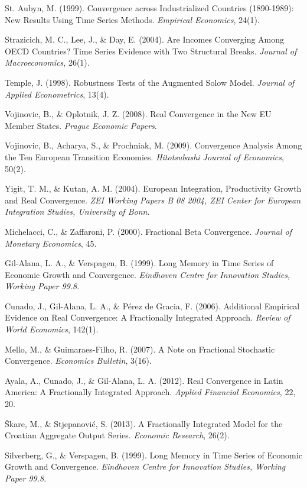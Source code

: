 \documentclass{crebsshr}
\begin{document}
\begin{thebibliography}{160}
St. Aubyn, M. (1999). Convergence across Industrialized Countries (1890-1989): New Results Using Time Series Methods. \emph{Empirical Economics}, 24(1).

Strazicich, M. C., Lee, J., \& Day, E. (2004). Are Incomes Converging Among OECD Countries? Time Series Evidence with Two Structural Breaks. \emph{Journal of Macroeconomics}, 26(1).

Temple, J. (1998). Robustness Tests of the Augmented Solow Model. \emph{Journal of Applied Econometrics}, 13(4).

Vojinovic, B., \& Oplotnik, J. Z. (2008). Real Convergence in the New EU Member States. \emph{Prague Economic Papers}.

Vojinovic, B., Acharya, S., \& Prochniak, M. (2009). Convergence Analysis Among the Ten European Transition Economies. \emph{Hitotsubashi Journal of Economics}, 50(2).

Yigit, T. M., \& Kutan, A. M. (2004). European Integration, Productivity Growth and Real Convergence. \emph{ZEI Working Papers B 08 2004, ZEI Center for European Integration Studies, University of Bonn}.

Michelacci, C., \& Zaffaroni, P. (2000). Fractional Beta Convergence. \emph{Journal of Monetary Economics}, 45.

Gil-Alana, L. A., \& Verspagen, B. (1999). Long Memory in Time Series of Economic Growth and Convergence. \emph{Eindhoven Centre for Innovation Studies, Working Paper 99.8}.

Cunado, J., Gil-Alana, L. A., \& Pérez de Gracia, F. (2006). Additional Empirical Evidence on Real Convergence: A Fractionally Integrated Approach. \emph{Review of World Economics}, 142(1).

Mello, M., \& Guimaraes-Filho, R. (2007). A Note on Fractional Stochastic Convergence. \emph{Economics Bulletin}, 3(16).

Ayala, A., Cunado, J., \& Gil-Alana, L. A. (2012). Real Convergence in Latin America: A Fractionally Integrated Approach. \emph{Applied Financial Economics}, 22, 20.

Škare, M., \& Stjepanović, S. (2013). A Fractionally Integrated Model for the Croatian Aggregate Output Series. \emph{Economic Research}, 26(2).

Silverberg, G., \& Verspagen, B. (1999). Long Memory in Time Series of Economic Growth and Convergence. \emph{Eindhoven Centre for Innovation Studies, Working Paper 99.8}.

\end{thebibliography}
\end{document}
